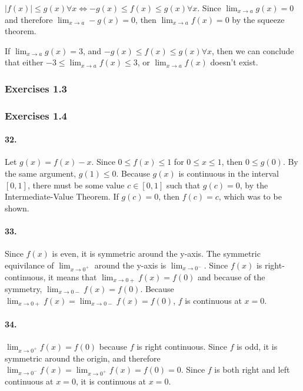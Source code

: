 $|f(x)| \leq g(x) \forall x \Leftrightarrow -g(x) \leq f(x) \leq g(x) \forall x$. Since $\lim_{x\rightarrow a} g(x) = 0$ and therefore $\lim_{x\rightarrow a} -g(x) = 0$, then $\lim_{x\rightarrow a} f(x) = 0$ by the squeeze theorem.

If $\lim_{x\rightarrow a} g(x) = 3$, and $-g(x) \leq f(x) \leq g(x) \forall x$, then we can conclude that either $-3 \leq \lim_{x\rightarrow a} f(x) \leq 3$, or $\lim_{x\rightarrow a} f(x)$ doesn't exist.

\subsubsection{Exercises 1.3}

\subsubsection{Exercises 1.4}

\paragraph{32.}

Let $g(x) = f(x) - x$. Since $0 \leq f(x) \leq 1$ for $0 \leq x \leq 1$, then $0 \leq g(0)$. By the same argument, $g(1) \leq 0$. Because $g(x)$ is continuous in the interval $[0,1]$, there must be some value $c \in [0,1]$ such that $g(c)=0$, by the Intermediate-Value Theorem. If $g(c)=0$, then $f(c)=c$, which was to be shown.

\paragraph{33.}

Since $f(x)$ is even, it is symmetric around the y-axis. The symmetric equivilance of $\lim_{x\rightarrow 0^+}$ around the y-axis is $\lim_{x\rightarrow 0^-}$. Since $f(x)$ is right-continuous, it means that $\lim_{x\rightarrow 0+} f(x) = f(0)$ and because of the symmetry, $\lim_{x\rightarrow 0-} f(x) = f(0)$. Because $\lim_{x\rightarrow 0+} f(x) = \lim_{x\rightarrow 0-} f(x) = f(0)$, $f$ is continuous at $x=0$.

\paragraph{34.}

$\lim_{x\rightarrow 0^+} f(x) = f(0)$ because $f$ is right continuous. Since $f$ is odd, it is symmetric around the origin, and therefore $\lim_{x\rightarrow 0^-} f(x) = \lim_{x\rightarrow 0^+} f(x) = f(0) = 0$. Since $f$ is both right and left continuous at $x=0$, it is continuous at $x=0$.

